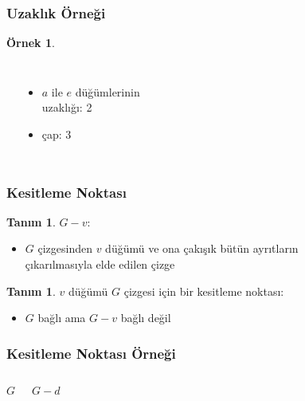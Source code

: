 \documentclass[dvipsnames]{beamer}
\theoremstyle{definition}
\newtheorem{tanim}[theorem]{Tanım}
\theoremstyle{example}
\newtheorem{ornek}[theorem]{Örnek}
\theoremstyle{plain}
\begin{document}
\begin{frame}
  \frametitle{Uzaklık Örneği}

  \begin{ornek}
    \begin{columns}
      \begin{center}
      \end{center}

      \pause
      \begin{itemize}
        \item $a$ ile $e$ düğümlerinin\\
          uzaklığı: 2
        \item çap: 3
      \end{itemize}
    \end{columns}
  \end{ornek}
\end{frame}

\begin{frame}
  \frametitle{Kesitleme Noktası}

  \begin{tanim}
    \alert{$G - v$}:
    \begin{itemize}
      \item $G$ çizgesinden $v$ düğümü ve ona çakışık bütün ayrıtların\\
        çıkarılmasıyla elde edilen çizge
    \end{itemize}
  \end{tanim}

  \pause
  \begin{tanim}
    $v$ düğümü $G$ çizgesi için bir \alert{kesitleme noktası}:
    \begin{itemize}
      \item $G$ bağlı ama $G - v$ bağlı değil
    \end{itemize}
  \end{tanim}
\end{frame}

\begin{frame}
  \frametitle{Kesitleme Noktası Örneği}

  \begin{columns}
    \begin{block}{$G$}
      \begin{center}
      \end{center}
    \end{block}

    \begin{block}{$G - d$}
      \begin{center}
      \end{center}
    \end{block}
  \end{columns}
\end{frame}
\end{document}

